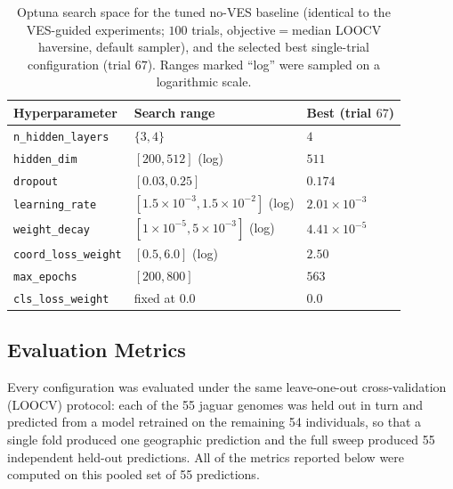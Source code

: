 \documentclass[twocolumn,10pt]{article}
\begin{document}
\begin{table}[t]
\centering
\caption{Optuna search space for the tuned no-VES baseline (identical to the VES-guided experiments;
$100$ trials, objective${}={}$median LOOCV haversine, default sampler), and the selected best
single-trial configuration (trial $67$). Ranges marked ``log'' were sampled on a logarithmic scale.}
\label{tab:noves-search}
\begin{tabular}{lll}
\toprule
Hyperparameter & Search range & Best (trial $67$) \\
\midrule
\texttt{n\_hidden\_layers} & $\{3,4\}$ & $4$ \\
\texttt{hidden\_dim} & $[200, 512]$ (log) & $511$ \\
\texttt{dropout} & $[0.03, 0.25]$ & $0.174$ \\
\texttt{learning\_rate} & $[1.5\times10^{-3}, 1.5\times10^{-2}]$ (log) & $2.01\times10^{-3}$ \\
\texttt{weight\_decay} & $[1\times10^{-5}, 5\times10^{-3}]$ (log) & $4.41\times10^{-5}$ \\
\texttt{coord\_loss\_weight} & $[0.5, 6.0]$ (log) & $2.50$ \\
\texttt{max\_epochs} & $[200, 800]$ & $563$ \\
\texttt{cls\_loss\_weight} & fixed at $0.0$ & $0.0$ \\
\bottomrule
\end{tabular}
\end{table}

\subsection{Evaluation Metrics}
Every configuration was evaluated under the same leave-one-out cross-validation (LOOCV) protocol:
each of the 55 jaguar genomes was held out in turn and predicted from a model retrained on the
remaining 54 individuals, so that a single fold produced one geographic prediction and the full
sweep produced 55 independent held-out predictions. All of the metrics reported below were computed
on this pooled set of 55 predictions.
\end{document}
